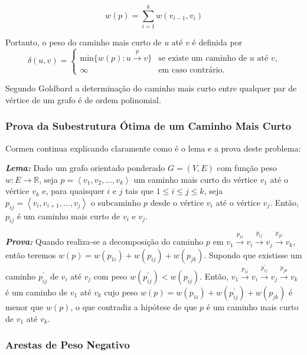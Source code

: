 \documentclass[12pt]{article}
\begin{document}
    $$w(p) = \sum_{i=1}^{k} w(v_{i-1}, v_{i})$$
   
Portanto, o peso do caminho mais curto de $u$ até $v$ é definida por 
$$
	\delta(u, v) = 
	\begin{cases}
		\text{min}\{w(p):u\xrightarrow{p} v\} & \text{se existe um caminho de } u \text{ até } v\text{,}\\
		\infty & \text{em caso contrário.}
	\end{cases}
$$

Segundo Goldbard\cite{goldbarg2012grafos} a determinação do caminho mais curto entre qualquer par de vértice de um grafo é de ordem polinomial.




\subsubsection{Prova da Subestrutura Ótima de um Caminho Mais Curto}

Cormen \cite{cormen2002algoritmos} continua explicando claramente como é o lema e a prova deste problema:

\textit{\textbf{Lema:}} Dado um grafo orientado ponderado $G = (V, E)$ com função peso $w : E \rightarrow \mathbb{R}$, seja $p = \left \langle v_{1}, v_{2}, \ldots, v_{k}\right \rangle$ um caminho mais curto do vértice $v_1$ até o vértice $v_k$ e, para quaisquer $i$ e $j$ tais que $1 \le i \le j \le k$, seja $p_{ij}= \left \langle v_{i}, v_{i + 1}, \ldots, v_{j}\right \rangle$ o subcaminho $p$ desde o vértice $v_i$ até o vértice $v_j$. Então, $p_{ij}$ é um caminho mais curto de $v_i$ e $v_j$.

\textit{\textbf{Prova:}} Quando realiza-se a decomposição do caminho $p$ em $v_1 \xrightarrow{p_{1i}} v_i \xrightarrow{p_{ij}} v_j \xrightarrow{p_{jk}} v_k$, então teremos $w(p) = w(p_{1i}) + w(p_{ij}) + w(p_{jk})$. Supondo que existisse um caminho $p^\prime_{ij}$ de $v_i$ até $v_j$ com peso $w(p^\prime_{ij}) < w(p_{ij})$. Então, $v_1 \xrightarrow{p_{1i}} v_i \xrightarrow{p^\prime_{ij}} v_j \xrightarrow{p_{jk}} v_k$ é um caminho de $v_1$ até $v_k$ cujo peso $w(p) = w(p_{1i}) + w(p^\prime_{ij}) + w(p_{jk})$ é menor que $w(p)$, o que contradiz a hipótese de que $p$ é um caminho mais curto de $v_1$ até $v_k$.



\subsubsection{Arestas de Peso Negativo}
\end{document}
